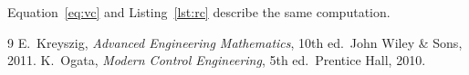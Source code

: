 \documentclass[11pt]{article}
\begin{document}


Equation~\eqref{eq:vc} and Listing~\ref{lst:rc} describe the same computation.

\begin{thebibliography}{9}
    E.~Kreyszig, \emph{Advanced Engineering Mathematics}, 10th ed.\
    John Wiley \& Sons, 2011.
    K.~Ogata, \emph{Modern Control Engineering}, 5th ed.\ Prentice Hall, 2010.
\end{thebibliography}
\end{document}
